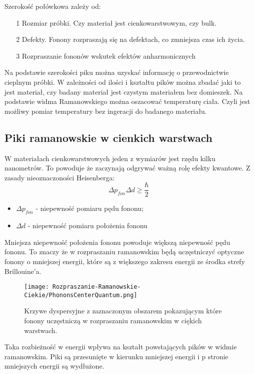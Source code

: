 Szerokość połówkowa zależy od:
\begin{itemize}
	\item[1]{Rozmiar próbki. Czy materiał jest cienkowarstwowym, czy bulk.}
	\item[2]{Defekty. Fonony rozpraszają się na defektach, co zmniejsza czas ich życia.}
	\item[3]{Rozpraszanie fononów wskutek efektów anharmonicznych}
\end{itemize}
Na podstawie szerokości piku można uzyskać informację o przewodnictwie cieplnym próbki. 
W zależności od ilości i kształtu pików można zbadać jaki to jest materiał, czy badany materiał jest czystym materiałem bez domieszek.
Na podstawie widma Ramanowskiego można oszacować temperaturę ciała. Czyli jest możliwy pomiar temperatury bez ingeracji do badanego materiału.

\subsection{Piki ramanowskie w cienkich warstwach}
W materiałach cienkowarstwowych jeden z wymiarów jest rzędu kilku nanometrów. To powoduje że zaczynają odgrywać ważną rolę efekty kwantowe. Z zasady nieoznaczoności Heisenberga:
\begin{equation}
	\Delta p_{fon} \Delta d \geq \frac{\hbar}{2}
\end{equation}
\begin{itemize}
	\item{$\Delta p_{fon}$ - niepewność pomiaru pędu fononu};
	\item{$\Delta d$ - niepewność pomiaru położenia fononu}
\end{itemize}
Mniejsza niepewność położenia fononu powoduje większą niepewność pędu fononu. To znaczy że w rozpraszaniu ramanowskim będą uczęstniczyć optyczne fonony o mniejszej energii, które są z większego zakresu energii ze środka strefy Brillouine'a.

\begin{figure}[H]
	\begin{center}
		\texttt{[image: Rozpraszanie-Ramanowskie-Ciekie/PhononsCenterQuantum.png]}
		\caption{Krzywe dyspersyjne z zaznaczonym obszarem pokazującym które fonony uczęstniczą w rozpraszaniu ramanowskim w ciękich warstwach.}
	\end{center}
\end{figure}

Taka rozbieżność w energii wpływa na kształt powstających pików w widmie ramanowskim.
Piki są przesunięte w kierunku mniejszej energii i p stronie mniejszych energii są wydłużone.

